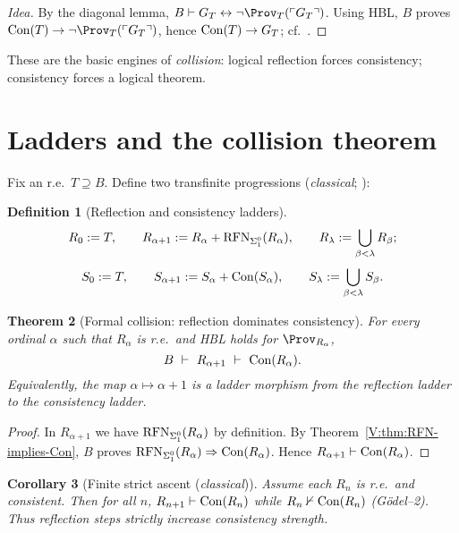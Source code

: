 \documentclass[11pt]{article}
\newtheorem{theorem}{Theorem}[section]
\newtheorem{corollary}[theorem]{Corollary}
\theoremstyle{definition}
\newtheorem{definition}[theorem]{Definition}
\theoremstyle{remark}
\begin{document}
\begin{proof}[Idea]
By the diagonal lemma, \(B\vdash G_T\leftrightarrow \neg\Prov_T(\ulcorner G_T\urcorner)\).
Using HBL, \(B\) proves \(\Con(T)\to \neg\Prov_T(\ulcorner G_T\urcorner)\), hence \(\mathrm{Con}(T)\to G_T\); cf.\ \cite{HajekPudlak}.
\end{proof}

These are the basic engines of \emph{collision}: logical reflection forces consistency; consistency forces a logical theorem.

\section{Ladders and the collision theorem}

Fix an r.e.\ \(T\supseteq B\). Define two transfinite progressions (\emph{classical}; \cite{Turing1939,Feferman1962}):

\begin{definition}[Reflection and consistency ladders]\label{V:def:ladders}
\[
R_0:=T,\qquad R_{\alpha+1}:=R_\alpha+\mathrm{RFN}_{\Sigma^0_1}(R_\alpha),\qquad R_\lambda:=\bigcup_{\beta<\lambda}R_\beta;
\]
\[
S_0:=T,\qquad S_{\alpha+1}:=S_\alpha+\mathrm{Con}(S_\alpha),\qquad S_\lambda:=\bigcup_{\beta<\lambda}S_\beta.
\]
\end{definition}

\begin{theorem}[Formal collision: reflection dominates consistency]\label{V:thm:collision}
For every ordinal \(\alpha\) such that \(R_\alpha\) is r.e.\ and HBL holds for \(\Prov_{R_\alpha}\),
\[
B\ \vdash\ R_{\alpha+1}\ \vdash\ \Con(R_\alpha).
\]
Equivalently, the map \(\alpha\mapsto \alpha{+}1\) is a \emph{ladder morphism} from the reflection ladder to the consistency ladder.
\end{theorem}

\begin{proof}
In \(R_{\alpha+1}\) we have \(\mathrm{RFN}_{\Sigma^0_1}(R_\alpha)\) by definition. By Theorem~\ref{V:thm:RFN-implies-Con},
\(B\) proves \(\mathrm{RFN}_{\Sigma^0_1}(R_\alpha)\Rightarrow \mathrm{Con}(R_\alpha)\). Hence \(R_{\alpha+1}\vdash \mathrm{Con}(R_\alpha)\).
\end{proof}

\begin{corollary}[Finite strict ascent (\emph{classical})]\label{V:cor:finite-ascent}
Assume each \(R_n\) is r.e.\ and consistent. Then for all \(n\),
\(R_{n+1}\vdash \mathrm{Con}(R_n)\) while \(R_n\nvdash \mathrm{Con}(R_n)\) (G\"odel–2). Thus reflection steps strictly increase consistency strength.
\end{corollary}
\end{document}
